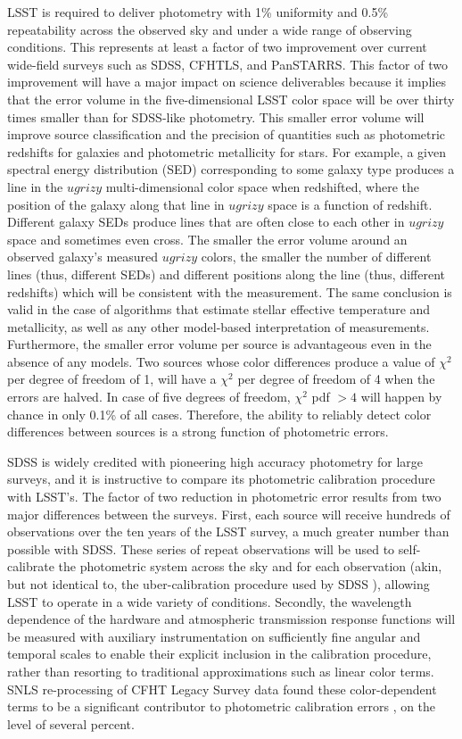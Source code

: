 \documentclass[12pt,preprint]{aastex}
\begin{document}
LSST is required to deliver photometry with 1\% uniformity and
0.5\% repeatability across the observed
sky and under a wide range of observing conditions. This represents at least a
factor of two improvement over current wide-field surveys such as
SDSS, CFHTLS, and PanSTARRS. This factor of two improvement will have a major impact on
science deliverables because it implies that the error volume in the
five-dimensional LSST color space will be over thirty times smaller
than for SDSS-like photometry. This smaller error volume will improve
source classification and the precision of quantities such as
photometric redshifts for galaxies and photometric metallicity for
stars.  For example, a given spectral energy distribution (SED)
corresponding to some galaxy type produces a line in the $ugrizy$
multi-dimensional color space when redshifted, where the position of
the galaxy along that line in $ugrizy$ space is a function of
redshift. Different galaxy SEDs produce lines that are often close to
each other in $ugrizy$ space and sometimes even cross. The smaller the
error volume around an observed galaxy's measured $ugrizy$ colors, the
smaller the number of different lines (thus, different SEDs) and
different positions along the line (thus, different redshifts) which
will be consistent with the measurement. The same conclusion is valid
in the case of algorithms that estimate stellar effective temperature
and metallicity, as well as any other model-based interpretation of
measurements. Furthermore, the smaller error volume per source is
advantageous even in the absence of any models. Two sources whose
color differences produce a value of $\chi^2$ per degree of freedom of
1, will have a $\chi^2$ per degree of freedom of 4 when the errors are
halved. In case of five degrees of freedom, $\chi^2$ pdf $>4$ will
happen by chance in only 0.1\% of all cases. Therefore, the ability to
reliably detect color differences between sources is a strong function
of photometric errors.

SDSS is widely credited with pioneering high accuracy photometry for large
surveys, and it is instructive to compare its photometric calibration procedure with LSST's.
The factor of two reduction in photometric error results from two major differences
between the surveys. First, each source will receive hundreds of
observations over the ten years of the LSST survey, a much greater number
than possible with SDSS. These series of
repeat observations will be used to self-calibrate the photometric
system across the sky and for each observation (akin, but not
identical to, the uber-calibration procedure used by SDSS
\citep{Padmanabhan2008}), allowing LSST to operate in a wide variety
of conditions. Secondly, the wavelength dependence of the hardware and
atmospheric transmission response functions will be measured with
auxiliary instrumentation on sufficiently fine angular and temporal
scales to enable their explicit inclusion in the calibration
procedure, rather than resorting to traditional approximations such as
linear color terms. SNLS re-processing of CFHT Legacy Survey data
found these color-dependent terms to be a significant contributor to
photometric calibration errors \citep{Regnault2009}, on
the level of several percent.
\end{document}

